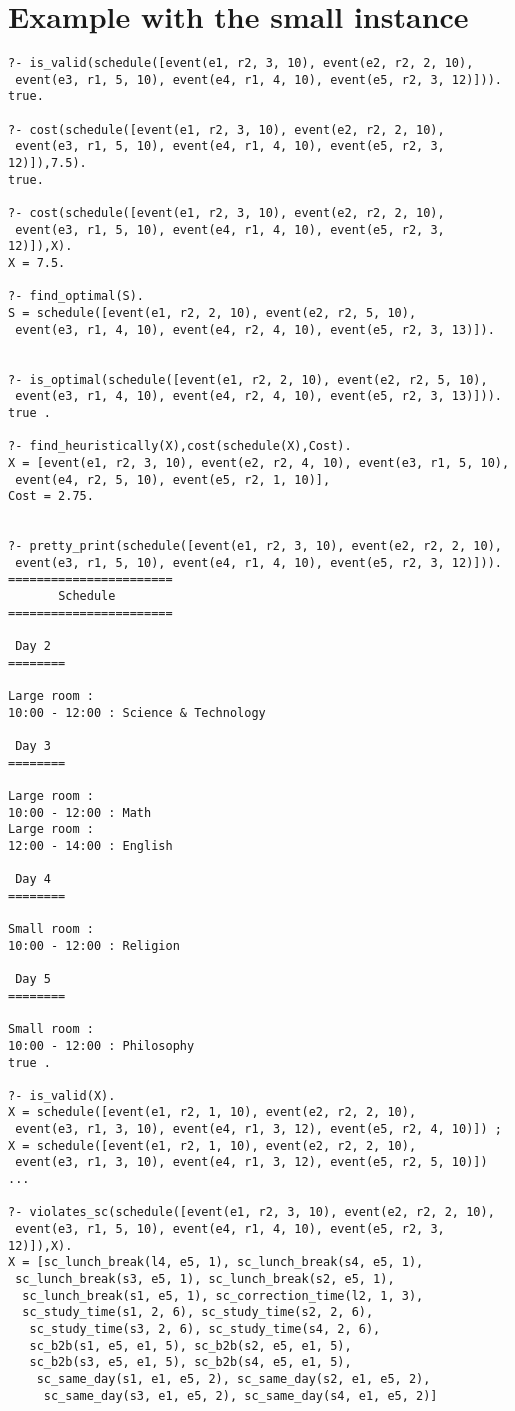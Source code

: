\documentclass[a4paper]{article}
\begin{document}
\section{Example with the small instance}
\begin{lstlisting}[style=Linux]
?- is_valid(schedule([event(e1, r2, 3, 10), event(e2, r2, 2, 10),
 event(e3, r1, 5, 10), event(e4, r1, 4, 10), event(e5, r2, 3, 12)])).
true.

?- cost(schedule([event(e1, r2, 3, 10), event(e2, r2, 2, 10),
 event(e3, r1, 5, 10), event(e4, r1, 4, 10), event(e5, r2, 3, 12)]),7.5).
true.

?- cost(schedule([event(e1, r2, 3, 10), event(e2, r2, 2, 10),
 event(e3, r1, 5, 10), event(e4, r1, 4, 10), event(e5, r2, 3, 12)]),X).
X = 7.5.

?- find_optimal(S).
S = schedule([event(e1, r2, 2, 10), event(e2, r2, 5, 10),
 event(e3, r1, 4, 10), event(e4, r2, 4, 10), event(e5, r2, 3, 13)]).
 
 
?- is_optimal(schedule([event(e1, r2, 2, 10), event(e2, r2, 5, 10),
 event(e3, r1, 4, 10), event(e4, r2, 4, 10), event(e5, r2, 3, 13)])).
true .

?- find_heuristically(X),cost(schedule(X),Cost).
X = [event(e1, r2, 3, 10), event(e2, r2, 4, 10), event(e3, r1, 5, 10),
 event(e4, r2, 5, 10), event(e5, r2, 1, 10)],
Cost = 2.75.


?- pretty_print(schedule([event(e1, r2, 3, 10), event(e2, r2, 2, 10),
 event(e3, r1, 5, 10), event(e4, r1, 4, 10), event(e5, r2, 3, 12)])).
=======================
       Schedule
=======================

 Day 2 
========

Large room :
10:00 - 12:00 : Science & Technology

 Day 3 
========

Large room :
10:00 - 12:00 : Math
Large room :
12:00 - 14:00 : English

 Day 4 
========

Small room :
10:00 - 12:00 : Religion

 Day 5 
========

Small room :
10:00 - 12:00 : Philosophy
true .

?- is_valid(X).
X = schedule([event(e1, r2, 1, 10), event(e2, r2, 2, 10),
 event(e3, r1, 3, 10), event(e4, r1, 3, 12), event(e5, r2, 4, 10)]) ;
X = schedule([event(e1, r2, 1, 10), event(e2, r2, 2, 10),
 event(e3, r1, 3, 10), event(e4, r1, 3, 12), event(e5, r2, 5, 10)])
...

?- violates_sc(schedule([event(e1, r2, 3, 10), event(e2, r2, 2, 10),
 event(e3, r1, 5, 10), event(e4, r1, 4, 10), event(e5, r2, 3, 12)]),X).
X = [sc_lunch_break(l4, e5, 1), sc_lunch_break(s4, e5, 1),
 sc_lunch_break(s3, e5, 1), sc_lunch_break(s2, e5, 1),
  sc_lunch_break(s1, e5, 1), sc_correction_time(l2, 1, 3),
  sc_study_time(s1, 2, 6), sc_study_time(s2, 2, 6),
   sc_study_time(s3, 2, 6), sc_study_time(s4, 2, 6),
   sc_b2b(s1, e5, e1, 5), sc_b2b(s2, e5, e1, 5),
   sc_b2b(s3, e5, e1, 5), sc_b2b(s4, e5, e1, 5),
    sc_same_day(s1, e1, e5, 2), sc_same_day(s2, e1, e5, 2),
     sc_same_day(s3, e1, e5, 2), sc_same_day(s4, e1, e5, 2)] 


\end{lstlisting}
\end{document}
